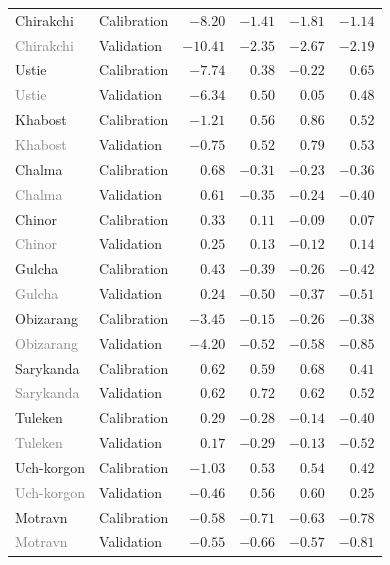\begin{longtable}{llrrrr}
\addlinespace
Chirakchi & Calibration & $-8.20$ & $-1.41$ & $-1.81$ & $-1.14$ \\
\textcolor{gray}{Chirakchi} & Validation & $-10.41$ & $-2.35$ & $-2.67$ & $-2.19$ \\
\addlinespace
Ustie & Calibration & $-7.74$ & $0.38$ & $-0.22$ & $0.65$ \\
\textcolor{gray}{Ustie} & Validation & $-6.34$ & $0.50$ & $0.05$ & $0.48$ \\
\addlinespace
Khabost & Calibration & $-1.21$ & $0.56$ & $0.86$ & $0.52$ \\
\textcolor{gray}{Khabost} & Validation & $-0.75$ & $0.52$ & $0.79$ & $0.53$ \\
\addlinespace
Chalma & Calibration & $0.68$ & $-0.31$ & $-0.23$ & $-0.36$ \\
\textcolor{gray}{Chalma} & Validation & $0.61$ & $-0.35$ & $-0.24$ & $-0.40$ \\
\addlinespace
Chinor & Calibration & $0.33$ & $0.11$ & $-0.09$ & $0.07$ \\
\textcolor{gray}{Chinor} & Validation & $0.25$ & $0.13$ & $-0.12$ & $0.14$ \\
\addlinespace
Gulcha & Calibration & $0.43$ & $-0.39$ & $-0.26$ & $-0.42$ \\
\textcolor{gray}{Gulcha} & Validation & $0.24$ & $-0.50$ & $-0.37$ & $-0.51$ \\
\addlinespace
Obizarang & Calibration & $-3.45$ & $-0.15$ & $-0.26$ & $-0.38$ \\
\textcolor{gray}{Obizarang} & Validation & $-4.20$ & $-0.52$ & $-0.58$ & $-0.85$ \\
\addlinespace
Sarykanda & Calibration & $0.62$ & $0.59$ & $0.68$ & $0.41$ \\
\textcolor{gray}{Sarykanda} & Validation & $0.62$ & $0.72$ & $0.62$ & $0.52$ \\
\addlinespace
Tuleken & Calibration & $0.29$ & $-0.28$ & $-0.14$ & $-0.40$ \\
\textcolor{gray}{Tuleken} & Validation & $0.17$ & $-0.29$ & $-0.13$ & $-0.52$ \\
\addlinespace
Uch-korgon & Calibration & $-1.03$ & $0.53$ & $0.54$ & $0.42$ \\
\textcolor{gray}{Uch-korgon} & Validation & $-0.46$ & $0.56$ & $0.60$ & $0.25$ \\
\addlinespace
Motravn & Calibration & $-0.58$ & $-0.71$ & $-0.63$ & $-0.78$ \\
\textcolor{gray}{Motravn} & Validation & $-0.55$ & $-0.66$ & $-0.57$ & $-0.81$ \\

\end{longtable}
